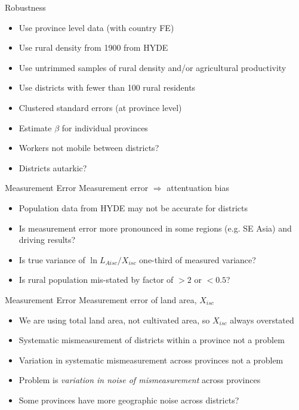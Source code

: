 \documentclass[10pt, xcolor=dvipsnames]{beamer}
\begin{document}
\begin{frame}{Robustness}\label{robustness}
\begin{itemize}
  \item Use province level data (with country FE) \hyperlink{regprov}{}
  \item Use rural density from 1900 from HYDE \hyperlink{reg1900}{}
  \item Use untrimmed samples of rural density and/or agricultural productivity
  \item Use districts with fewer than 100 rural residents
  \item Clustered standard errors (at province level) \hyperlink{cluster}{}
  \item Estimate $\beta$ for individual provinces \hyperlink{prov}{}
  \item Workers not mobile between districts? \hyperlink{nonmobile}{}
  \item Districts autarkic? \hyperlink{autarky}{}
\end{itemize}
\end{frame}

\begin{frame}{Measurement Error}
Measurement error $\Rightarrow$ attentuation bias
\begin{itemize}
  \item Population data from HYDE may not be accurate for districts
  \item Is measurement error more pronounced in some regions (e.g. SE Asia) and driving results?
  \item Is true variance of $\ln L_{Aisc}/X_{isc}$ one-third of measured variance?
  \item Is rural population mis-stated by factor of $>2$ or $<0.5$?
\end{itemize}
\end{frame}

\begin{frame}{Measurement Error}
Measurement error of land area, $X_{isc}$
\begin{itemize}
  \item We are using total land area, not cultivated area, so $X_{isc}$ always overstated
  \item Systematic mismeasurement of districts within a province not a problem
  \item Variation in systematic mismeasurement across provinces not a problem
  \item Problem is \textit{variation in noise of mismeasurement} across provinces
  \item Some provinces have more geographic noise across districts?
\end{itemize}
\end{frame}
\end{document}
